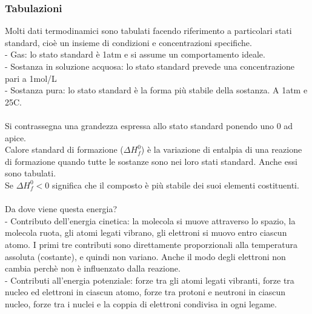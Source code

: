 \subsubsection{Tabulazioni}
Molti dati termodinamici sono tabulati facendo riferimento a particolari stati standard, cioè un insieme di condizioni e concentrazioni specifiche.\\
\tab- Gas: lo stato standard è 1atm e si assume un comportamento ideale.\\
\tab- Sostanza in soluzione acquosa: lo stato standard prevede una concentrazione pari a 1mol/L\\
\tab- Sostanza pura: lo stato standard è la forma più stabile della sostanza. A 1atm e 25C.\\\\
Si contrassegna una grandezza espressa allo stato standard ponendo uno 0 ad apice.\\
Calore standard di formazione ($\Delta H^0_f$) è la variazione di entalpia di una reazione di formazione quando tutte le sostanze sono nei loro stati standard. Anche essi sono tabulati.\\
Se $\Delta H^0_f < 0$ significa che il composto è più stabile dei suoi elementi costituenti.\\\\
Da dove viene questa energia?\\
\tab- Contributo dell'energia cinetica: la molecola si muove attraverso lo spazio, la molecola ruota, gli atomi legati vibrano, gli elettroni si muovo entro ciascun atomo. I primi tre contributi sono direttamente proporzionali alla temperatura assoluta (costante), e quindi non variano. Anche il modo degli elettroni non cambia perchè non è influenzato dalla reazione.\\
\tab- Contributi all'energia potenziale: forze tra gli atomi legati vibranti, forze tra nucleo ed elettroni in ciascun atomo, forze tra protoni e neutroni in ciascun nucleo, forze tra i nuclei e la coppia di elettroni condivisa in ogni legame.\\
